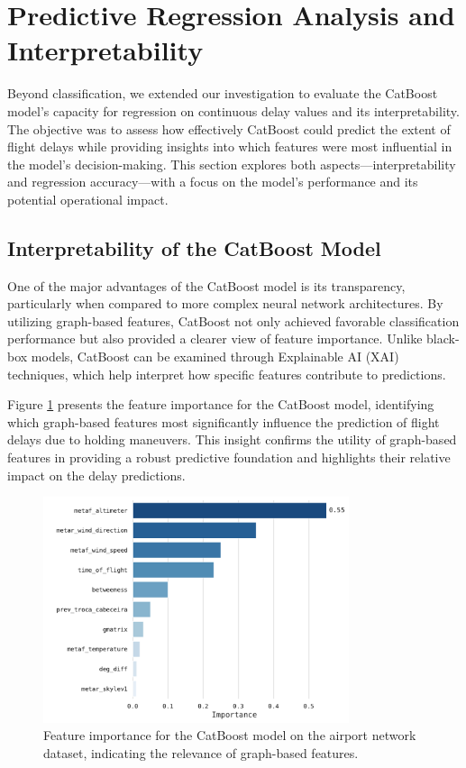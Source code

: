 \section{Predictive Regression Analysis and Interpretability}

Beyond classification, we extended our investigation to evaluate the CatBoost model's capacity for regression on continuous delay values and its interpretability. The objective was to assess how effectively CatBoost could predict the extent of flight delays while providing insights into which features were most influential in the model's decision-making. This section explores both aspects—interpretability and regression accuracy—with a focus on the model’s performance and its potential operational impact.

\subsection{Interpretability of the CatBoost Model}

One of the major advantages of the CatBoost model is its transparency, particularly when compared to more complex neural network architectures. By utilizing graph-based features, CatBoost not only achieved favorable classification performance but also provided a clearer view of feature importance. Unlike black-box models, CatBoost can be examined through Explainable AI (XAI) techniques, which help interpret how specific features contribute to predictions.

Figure \ref{fig:catboost_feature_importance} presents the feature importance for the CatBoost model, identifying which graph-based features most significantly influence the prediction of flight delays due to holding maneuvers. This insight confirms the utility of graph-based features in providing a robust predictive foundation and highlights their relative impact on the delay predictions.

\begin{figure}[!htbp]
    \centering
    \includegraphics[width=0.8\textwidth]{img/feature_importance_plot.pdf}
    \caption{Feature importance for the CatBoost model on the airport network dataset, indicating the relevance of graph-based features.}
    \label{fig:catboost_feature_importance}
\end{figure}

